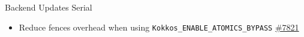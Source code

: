 \begin{frame}[fragile]{Backend Updates Serial}
  \begin{itemize}
    \item Reduce fences overhead when using \texttt{Kokkos\_ENABLE\_ATOMICS\_BYPASS} \hyperlink{https://github.com/kokkos/kokkos/pull/7821}{\#7821}
  \end{itemize}
\end{frame}

%        





